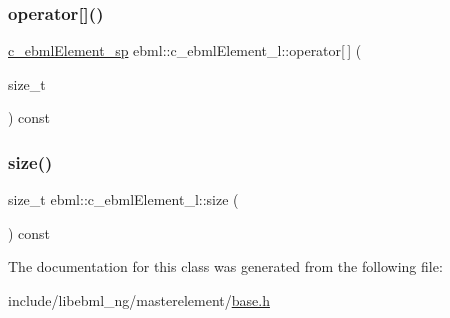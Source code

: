 \mbox{\label{classebml_1_1c__ebmlElement__l_a96efd97da3095d4041f055415ab9ae6b}} 
\subsubsection{\texorpdfstring{operator[]()}{operator[]()}}
{\footnotesize\ttfamily \mbox{\hyperlink{namespaceebml_a2deef4e8071531b32e3533f1bf978917}{c\+\_\+ebml\+Element\+\_\+sp}} ebml\+::c\+\_\+ebml\+Element\+\_\+l\+::operator\mbox{[}$\,$\mbox{]} (\begin{DoxyParamCaption}\item[{size\+\_\+t}]{ }\end{DoxyParamCaption}) const}

\mbox{\label{classebml_1_1c__ebmlElement__l_adc228d5daa606faf08cb29feedee3d33}} 
\subsubsection{\texorpdfstring{size()}{size()}}
{\footnotesize\ttfamily size\+\_\+t ebml\+::c\+\_\+ebml\+Element\+\_\+l\+::size (\begin{DoxyParamCaption}{ }\end{DoxyParamCaption}) const}



The documentation for this class was generated from the following file\+:\begin{DoxyCompactItemize}
\item 
include/libebml\+\_\+ng/masterelement/\mbox{\hyperlink{base_8h}{base.\+h}}\end{DoxyCompactItemize}
